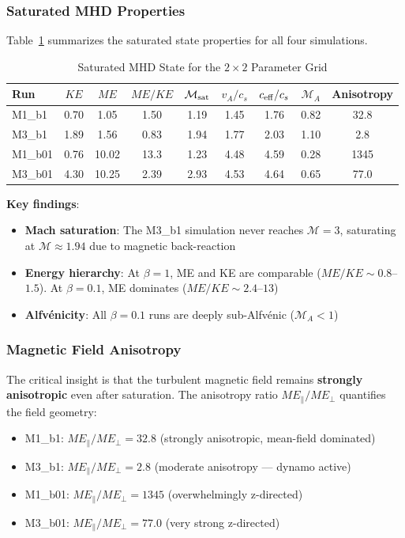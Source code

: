 \documentclass[11pt,a4paper]{article}
\begin{document}
\subsubsection{Saturated MHD Properties}

Table~\ref{tab:mhd_saturated} summarizes the saturated state properties for all four simulations.

\begin{table}[H]
\centering
\caption{Saturated MHD State for the $2\times2$ Parameter Grid}
\label{tab:mhd_saturated}
\begin{tabular}{lcccccccc}
\toprule
Run & $KE$ & $ME$ & $ME/KE$ & $\mathcal{M}_{\rm sat}$ & $v_A/c_s$ & $c_{\rm eff}/c_s$ & $\mathcal{M}_A$ & Anisotropy \\
\midrule
M1\_b1  & 0.70 & 1.05 & 1.50 & 1.19 & 1.45 & 1.76 & 0.82 & 32.8 \\
M3\_b1  & 1.89 & 1.56 & 0.83 & 1.94 & 1.77 & 2.03 & 1.10 & 2.8 \\
M1\_b01 & 0.76 & 10.02 & 13.3 & 1.23 & 4.48 & 4.59 & 0.28 & 1345 \\
M3\_b01 & 4.30 & 10.25 & 2.39 & 2.93 & 4.53 & 4.64 & 0.65 & 77.0 \\
\bottomrule
\end{tabular}
\end{table}

\noindent\textbf{Key findings}:
\begin{itemize}
    \item \textbf{Mach saturation}: The M3\_b1 simulation never reaches $\mathcal{M} = 3$, saturating at $\mathcal{M} \approx 1.94$ due to magnetic back-reaction
    \item \textbf{Energy hierarchy}: At $\beta = 1$, ME and KE are comparable ($ME/KE \sim 0.8$--$1.5$). At $\beta = 0.1$, ME dominates ($ME/KE \sim 2.4$--$13$)
    \item \textbf{Alfv\'enicity}: All $\beta = 0.1$ runs are deeply sub-Alfv\'enic ($\mathcal{M}_A < 1$)
\end{itemize}

\subsubsection{Magnetic Field Anisotropy}

The critical insight is that the turbulent magnetic field remains \textbf{strongly anisotropic} even after saturation. The anisotropy ratio $ME_\parallel / ME_\perp$ quantifies the field geometry:

\begin{itemize}
    \item M1\_b1: $ME_\parallel/ME_\perp = 32.8$ (strongly anisotropic, mean-field dominated)
    \item M3\_b1: $ME_\parallel/ME_\perp = 2.8$ (moderate anisotropy — dynamo active)
    \item M1\_b01: $ME_\parallel/ME_\perp = 1345$ (overwhelmingly z-directed)
    \item M3\_b01: $ME_\parallel/ME_\perp = 77.0$ (very strong z-directed)
\end{itemize}
\end{document}
